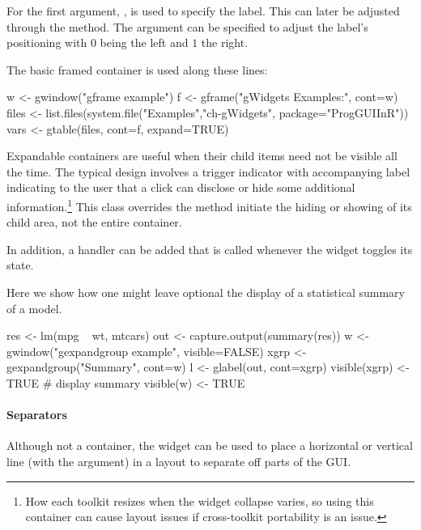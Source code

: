 For  the first argument, , is
used to specify the label. This can later be adjusted through the
 method. The argument
 can be specified to adjust the label's
positioning with $0$ being the left and $1$ the right.



The basic framed container is used along these lines:
\begin{Schunk}
\begin{Sinput}
 w <- gwindow("gframe example")
 f <- gframe("gWidgets Examples:", cont=w)
 files <- list.files(system.file("Examples","ch-gWidgets", 
                                 package="ProgGUIInR"))
 vars <- gtable(files, cont=f, expand=TRUE)
\end{Sinput}
\end{Schunk}


Expandable containers are useful when their child items need not be
visible all the time. The typical design involves a trigger indicator
with accompanying label indicating to the user that a click can
disclose or hide some additional information.\footnote{How each
  toolkit resizes when the widget collapse varies, so using this
  container can cause layout issues if cross-toolkit portability is an
  issue.}  This class overrides the
 method initiate
the hiding or showing of its child area, not the entire container.

In addition, a handler can be added that is called whenever the widget
toggles its state.

Here we show how one might leave optional the display of a statistical
summary of a model.
\begin{Schunk}
\begin{Sinput}
 res <- lm(mpg ~ wt, mtcars)
 out <- capture.output(summary(res))
 w <- gwindow("gexpandgroup example", visible=FALSE)
 xgrp <- gexpandgroup("Summary", cont=w)
 l <- glabel(out, cont=xgrp)
 visible(xgrp) <- TRUE                   # display summary
 visible(w) <- TRUE
\end{Sinput}
\end{Schunk}


\paragraph{Separators}
Although not a container, the  widget can be
used to place a horizontal or vertical line (with the
 argument) in a layout to separate off parts of
the GUI. 




